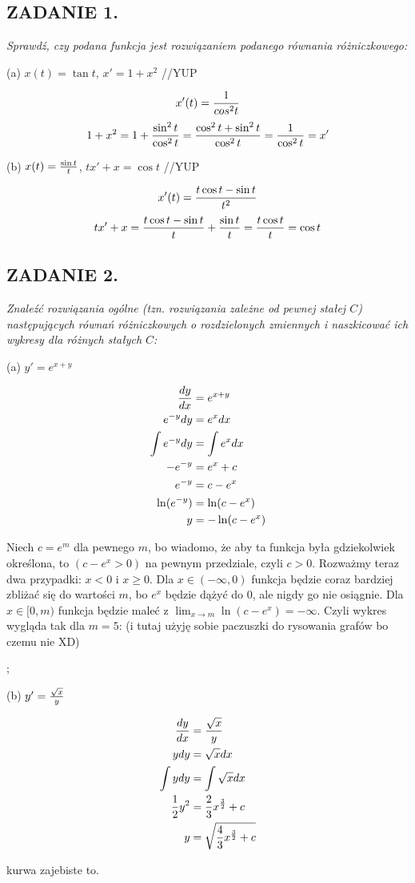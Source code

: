 \documentclass{article}
\begin{document}
\subsection*{ZADANIE 1.}
\emph{Sprawdź, czy podana funkcja jest rozwiązaniem podanego równania różniczkowego:}
\smallskip

{\color{dark-green}(a) $x(t)=\tan t$, $x'=1+x^2$} //YUP

$$x'(t)={1\over cos^2t}$$
$$1+x^2=1+{\sin^2t\over \cos^2t}={\cos^2t+\sin^2t\over\cos^2t}={1\over\cos^2t}=x'$$

{\color{dark-green}(b) $x(t)={\sin t\over t}$, $tx'+x=\cos t$} //YUP

$$x'(t)={t\cos t-\sin t\over t^2}$$
$$tx'+x={t\cos t-\sin t\over t}+{\sin t\over t}={t\cos t\over t}=\cos t$$

\subsection*{ZADANIE 2.}
\emph{Znaleźć rozwiązania ogólne (tzn. rozwiązania zależne od pewnej stałej $C$) następujących równań różniczkowych o rozdzielonych zmiennych i naszkicować ich wykresy dla różnych stałych $C$:}
\smallskip

{\color{dark-green}(a) $y'=e^{x+y}$}

\begin{align*}
    {dy\over dx}&=e^{x+y}\\
    e^{-y}dy&=e^xdx\\
    \int e^{-y}dy&=\int e^xdx\\
    -e^{-y}&=e^x+c\\
    e^{-y}&=c-e^x\\
    \ln(e^{-y})&=\ln(c-e^x)\\
    y&=-\ln(c-e^x)
\end{align*}

Niech $c=e^m$ dla pewnego $m$, bo wiadomo, że aby ta funkcja była gdziekolwiek określona, to $(c-e^x>0)$ na pewnym przedziale, czyli $c>0$. Rozważmy teraz dwa przypadki: $x<0$ i $x\geq 0$. Dla $x\in(-\infty, 0)$ funkcja będzie coraz bardziej zbliżać się do wartości $m$, bo $e^x$ będzie dążyć do $0$, ale nigdy go nie osiągnie. Dla $x\in [0, m)$ funkcja będzie maleć z $\lim_{x\to m}\ln(c-e^x)=-\infty$. Czyli wykres wygląda tak dla $m=5$: (i tutaj użyję sobie paczuszki do rysowania grafów bo czemu nie XD)

\begin{illustration}
    \begin{my-axis}
        ;
    \end{my-axis}
\end{illustration}

{\color{dark-green}(b) $y'={\sqrt{x}\over y}$}

\begin{align*}
    {dy\over dx}&={\sqrt{x}\over y}\\
    ydy&=\sqrt{x}dx\\
    \int ydy&=\int\sqrt{x}dx\\
    \frac12y^2&=\frac23x^{\frac32}+c\\
    y&=\sqrt{\frac43x^{\frac32}+c}
\end{align*}

kurwa zajebiste to.
\end{document}
